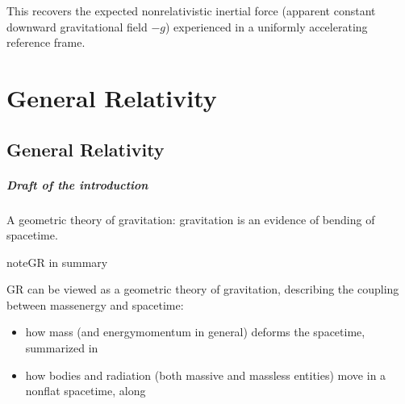 \documentclass[letterpaper,10pt,english]{jupyterBook}
\begin{document}
\sphinxAtStartPar
This recovers the expected non\sphinxhyphen{}relativistic inertial force (apparent constant downward gravitational field \(-g\)) experienced in a uniformly accelerating reference frame.

\sphinxstepscope


\part{General Relativity}

\sphinxstepscope


\chapter{General Relativity}
\label{\detokenize{ch/relativity-general/intro:general-relativity}}\label{\detokenize{ch/relativity-general/intro:relativity-general-intro}}\label{\detokenize{ch/relativity-general/intro::doc}}\subsubsection*{Draft of the introduction}

\sphinxAtStartPar
{} A geometric theory of gravitation: gravitation is an evidence of bending of spacetime.

\begin{sphinxadmonition}{note}{GR in summary}

\sphinxAtStartPar
GR can be viewed as a geometric theory of gravitation, describing the coupling between mass\sphinxhyphen{}energy and spacetime:
\begin{itemize}
\item {} 
\sphinxAtStartPar
how mass (and energy\sphinxhyphen{}momentum in general) deforms the spacetime, summarized in {\hyperref[\detokenize{ch/relativity-general/einstein-equation:relativity-general-notes-einstein-equation}]{}}

\item {} 
\sphinxAtStartPar
how bodies and radiation (both massive and mass\sphinxhyphen{}less entities) move in a non\sphinxhyphen{}flat spacetime, along {\hyperref[\detokenize{ch/relativity-general/geodesics:general-relativity-geodesics}]{}}

\end{itemize}
\end{sphinxadmonition}
\end{document}
